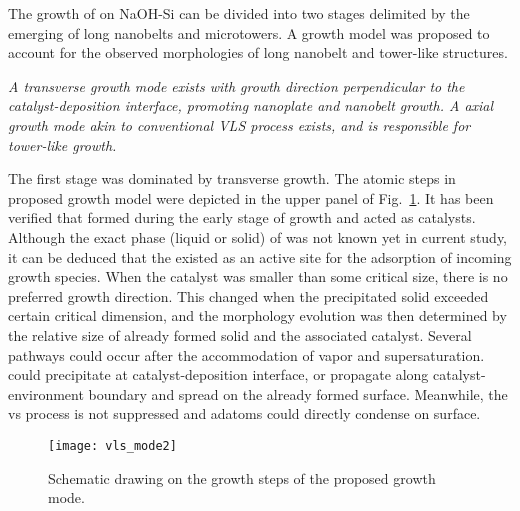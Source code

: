 The growth of  on NaOH-Si can be divided into two stages delimited by the emerging of long nanobelts and microtowers. A growth model was proposed to account for the observed morphologies of  long nanobelt and tower-like structures.
 
\emph{
A transverse growth mode exists with growth direction perpendicular to the catalyst-deposition interface, promoting  nanoplate and nanobelt growth. A axial growth mode akin to conventional VLS process exists, and is responsible for  tower-like growth.
}

The first stage was dominated by transverse growth. The atomic steps in proposed growth model were depicted in the upper panel of Fig.~\ref{fig:ch4vls}. It has been verified that  formed during the early stage of growth and acted as catalysts. Although the exact phase (liquid or solid) of  was not known yet in current study, it can be deduced that the  existed as an active site for the adsorption of incoming  growth species. When the catalyst was smaller than some critical size, there is no preferred growth direction. This changed when the precipitated solid exceeded certain critical dimension, and the morphology evolution was then determined by the relative size of already formed solid and the associated catalyst. Several pathways could occur after the accommodation of  vapor and supersaturation.  could precipitate at catalyst-deposition interface, or propagate along catalyst-environment boundary and spread on the already formed  surface. Meanwhile, the \gls{vs} process is not suppressed and  adatoms could directly condense on  surface.

\begin{figure}[htb]
\centering
\texttt{[image: vls\_mode2]}
\caption[Schematic drawing on the growth steps of the proposed growth mode]{Schematic drawing on the growth steps of the proposed growth mode.}
\label{fig:ch4vls}
\end{figure}

